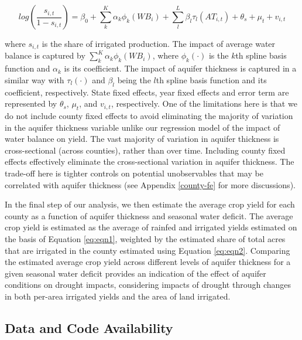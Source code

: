 \documentclass[
]{article}
\begin{document}
\begin{equation}
    log(\frac{s_{i,t}}{1-s_{i,t}}) = \beta_0 + \sum_{k}^K \alpha_{k}\phi_{k}(WB_{i}) + \sum_{l}^L \beta_{l}\tau_{l}(AT_{i,t}) + \theta_s + \mu_t + v_{i,t} \label{eq:eqn2}
\end{equation}

where \(s_{i,t}\) is the share of irrigated production. The impact of average water balance is captured by \(\sum_{k}^K \alpha_{k}\phi_{k}(WB_{i})\), where \(\phi_{k}(\cdot)\) is the \(k\)th spline basis function and \(\alpha_{k}\) is its coefficient. The impact of aquifer thickness is captured in a similar way with \(\tau_{l}(\cdot)\) and \(\beta_{l}\) being the \(l\)th spline basis function and its coefficient, respectively. State fixed effects, year fixed effects and error term are represented by \(\theta_s\), \(\mu_t\), and \(v_{i,t}\), respectively. One of the limitations here is that we do not include county fixed effects to avoid eliminating the majority of variation in the aquifer thickness variable unlike our regression model of the impact of water balance on yield. The vast majority of variation in aquifer thickness is cross-sectional (across counties), rather than over time. Including county fixed effects effectively eliminate the cross-sectional variation in aquifer thickness. The trade-off here is tighter controls on potential unobservables that may be correlated with aquifer thickness (see Appendix \ref{county-fe} for more discussions).

In the final step of our analysis, we then estimate the average crop yield for each county as a function of aquifer thickness and seasonal water deficit. The average crop yield is estimated as the average of rainfed and irrigated yields estimated on the basis of Equation \eqref{eq:eqn1}, weighted by the estimated share of total acres that are irrigated in the county estimated using Equation \eqref{eq:eqn2}. Comparing the estimated average crop yield across different levels of aquifer thickness for a given seasonal water deficit provides an indication of the effect of aquifer conditions on drought impacts, considering impacts of drought through changes in both per-area irrigated yields and the area of land irrigated.

\hypertarget{data-and-code-availability}{%
\subsection{Data and Code Availability}\label{data-and-code-availability}}
\end{document}
